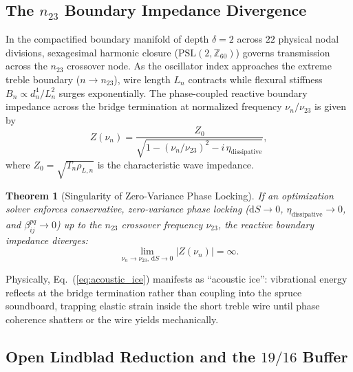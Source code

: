 \documentclass[aps,prl,twocolumn,superscriptaddress,10pt]{revtex4-2}
\newtheorem{theorem}{Theorem}[section]
\begin{document}
\subsection{The \texorpdfstring{$n_{23}$}{n23} Boundary Impedance Divergence}

In the compactified boundary manifold of depth $\delta = 2$ across $22$ physical nodal divisions, sexagesimal harmonic closure ($\text{PSL}(2,\mathbb{Z}_{60})$) governs transmission across the $n_{23}$ crossover node. As the oscillator index approaches the extreme treble boundary ($n \to n_{23}$), wire length $L_n$ contracts while flexural stiffness $B_n \propto d_n^4 / L_n^2$ surges exponentially. The phase-coupled reactive boundary impedance across the bridge termination at normalized frequency $\nu_n / \nu_{23}$ is given by
\begin{equation}
Z(\nu_n) = \frac{Z_0}{\sqrt{1 - (\nu_n / \nu_{23})^2 - i\,\eta_{\text{dissipative}}}},
\label{eq:impedance_general}
\end{equation}
where $Z_0 = \sqrt{T_n \rho_{L,n}}$ is the characteristic wave impedance.

\begin{theorem}[Singularity of Zero-Variance Phase Locking]
\label{thm:n23_singularity}
If an optimization solver enforces conservative, zero-variance phase locking ($\text{d}S \to 0$, $\eta_{\text{dissipative}} \to 0$, and $\beta_{ij}^{pq} \to 0$) up to the $n_{23}$ crossover frequency $\nu_{23}$, the reactive boundary impedance diverges:
\begin{equation}
\lim_{\nu_n \to \nu_{23},\, \text{d}S \to 0} |Z(\nu_n)| = \infty.
\label{eq:acoustic_ice}
\end{equation}
\end{theorem}
Physically, Eq.~(\ref{eq:acoustic_ice}) manifests as ``acoustic ice'': vibrational energy reflects at the bridge termination rather than coupling into the spruce soundboard, trapping elastic strain inside the short treble wire until phase coherence shatters or the wire yields mechanically.

\subsection{Open Lindblad Reduction and the \texorpdfstring{$19/16$}{19/16} Buffer}
\end{document}
